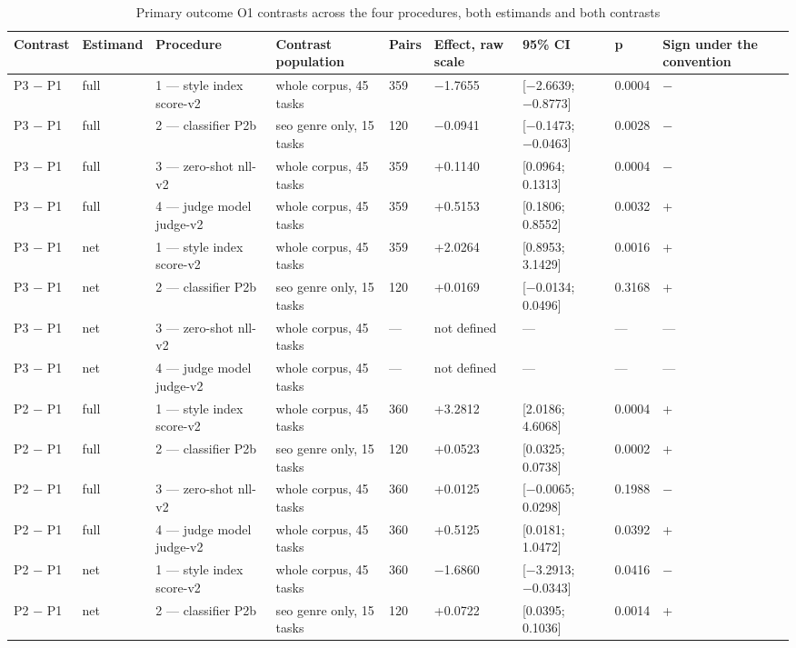 \begin{table}[htbp]
\centering
\scriptsize
\caption{Primary outcome O1 contrasts across the four procedures, both estimands and both contrasts}
\label{tab:3}
\begin{tabular}{lllllllll}
\toprule
Contrast & Estimand & Procedure & Contrast population & Pairs & Effect, raw scale & 95\% CI & p & Sign under the convention \\
\midrule
P3 − P1 & full & 1 — style index score-v2 & whole corpus, 45 tasks & 359 & −1.7655 & [−2.6639; −0.8773] & 0.0004 & − \\
P3 − P1 & full & 2 — classifier P2b & seo genre only, 15 tasks & 120 & −0.0941 & [−0.1473; −0.0463] & 0.0028 & − \\
P3 − P1 & full & 3 — zero-shot nll-v2 & whole corpus, 45 tasks & 359 & +0.1140 & [0.0964; 0.1313] & 0.0004 & − \\
P3 − P1 & full & 4 — judge model judge-v2 & whole corpus, 45 tasks & 359 & +0.5153 & [0.1806; 0.8552] & 0.0032 & + \\
P3 − P1 & net & 1 — style index score-v2 & whole corpus, 45 tasks & 359 & +2.0264 & [0.8953; 3.1429] & 0.0016 & + \\
P3 − P1 & net & 2 — classifier P2b & seo genre only, 15 tasks & 120 & +0.0169 & [−0.0134; 0.0496] & 0.3168 & + \\
P3 − P1 & net & 3 — zero-shot nll-v2 & whole corpus, 45 tasks & — & not defined & — & — & — \\
P3 − P1 & net & 4 — judge model judge-v2 & whole corpus, 45 tasks & — & not defined & — & — & — \\
P2 − P1 & full & 1 — style index score-v2 & whole corpus, 45 tasks & 360 & +3.2812 & [2.0186; 4.6068] & 0.0004 & + \\
P2 − P1 & full & 2 — classifier P2b & seo genre only, 15 tasks & 120 & +0.0523 & [0.0325; 0.0738] & 0.0002 & + \\
P2 − P1 & full & 3 — zero-shot nll-v2 & whole corpus, 45 tasks & 360 & +0.0125 & [−0.0065; 0.0298] & 0.1988 & − \\
P2 − P1 & full & 4 — judge model judge-v2 & whole corpus, 45 tasks & 360 & +0.5125 & [0.0181; 1.0472] & 0.0392 & + \\
P2 − P1 & net & 1 — style index score-v2 & whole corpus, 45 tasks & 360 & −1.6860 & [−3.2913; −0.0343] & 0.0416 & − \\
P2 − P1 & net & 2 — classifier P2b & seo genre only, 15 tasks & 120 & +0.0722 & [0.0395; 0.1036] & 0.0014 & + \\

\end{tabular}
\end{table}
